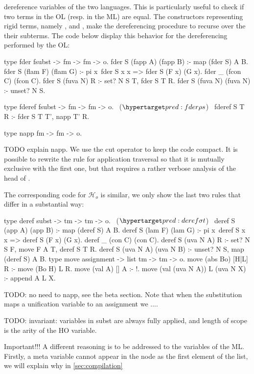 \documentclass[sigconf,natbib=false,review]{acmart}
\newcommand{\Ho}{\ensuremath{\mathcal{H}_o}\xspace}
\begin{document}
dereference variables of the two languages. This is particularly useful to check
if two terms in the OL (resp. in the ML) are equal. The constructors
representing rigid terms, namely ,  and ,
make the dereferencing procedure to recurse over the their subterms. The code
below display this behavior for the dereferencing performed by the OL:

\begin{elpicode}
type fder fsubst -> fm -> fm -> o.
fder S (fapp A) (fapp B) :- map (fder S) A B.
fder S (flam F) (flam G) :- 
  pi x\ fder S x x => fder S (F x) (G x).
fder _ (fcon C) (fcon C).
fder S (fuva N) R :- set? N S T, fder S T R.
fder S (fuva N) (fuva N) :- unset? N S.

type fderef fsubst -> fm -> fm -> o.                 ~($\customlabel{pred:fder}{\rho s}$)~
fderef S T R :- fder S T T', napp T' R.

type napp fm -> fm -> o.
\end{elpicode}

\noindent
TODO explain napp.
We use the cut operator to keep the code compact. It is possible to rewrite
the rule for application traversal so that it is mutually exclusive with the
first one, but that requires a rather verbose analysis of the head of .

The corresponding code for \Ho is similar, we only show the last two rules that
differ in a substantial way:

\begin{elpicode}
type deref subst -> tm -> tm -> o.                   ~($\customlabel{pred:deref}{\sigma t}$)~
deref S (app A) (app B) :- map (deref S) A B.
deref S (lam F) (lam G) :- 
  pi x\ deref S x x => deref S (F x) (G x).
deref _ (con C) (con C).
deref S (uva N A) R :- set? N S F, move F A T, deref S T R.
deref S (uva N A) (uva N B) :- unset? N S, map (deref S) A B.
type move assignment -> list tm -> tm -> o.
move (abs Bo)        [H|L] R :- move (Bo H) L R.
move (val A)         []    A :- !.
move (val (uva N A)) L     (uva N X) :- append A L X.
\end{elpicode}

\noindent
TODO: no need to napp, see the beta section.
Note that when the substitution  maps a unification variable
 to an assignment  we ....

TODO: invariant: variables in subst are always fully applied, and length of scope is the
arity of the HO variable. 

Important!!!
A different reasoning is to be addressed to the variables of the ML. Firstly, a
meta variable cannot appear in the  node as the first element of the
list, we will explain why in \cref{sec:compilation}
\end{document}
